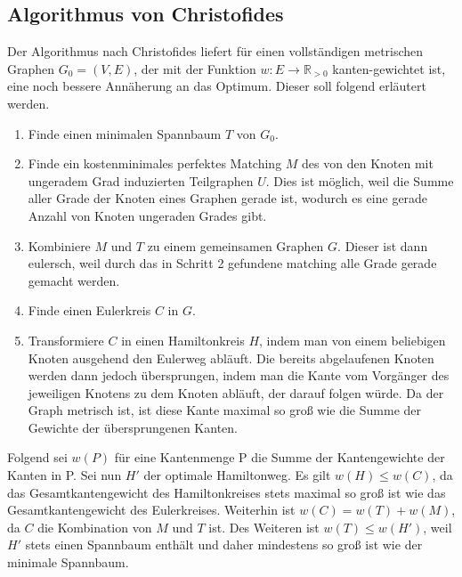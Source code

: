 \subsection{Algorithmus von Christofides}
Der Algorithmus nach Christofides liefert für einen vollständigen metrischen Graphen $G_0=(V,E)$, der mit der Funktion $w:E\rightarrow  \mathbb{R}_{>0}$ kanten-gewichtet ist, eine noch bessere Annäherung an das Optimum. Dieser soll folgend erläutert werden.

\begin{enumerate}
\item Finde einen minimalen Spannbaum $T$ von $G_0$.
\item Finde ein kostenminimales perfektes Matching $M$ des von den Knoten mit ungeradem Grad induzierten Teilgraphen $U$. Dies ist möglich, weil die Summe aller Grade der Knoten eines Graphen gerade ist, wodurch es eine gerade Anzahl von Knoten ungeraden Grades gibt.
\item Kombiniere $M$ und $T$ zu einem gemeinsamen Graphen $G$. Dieser ist dann eulersch, weil durch das in Schritt 2 gefundene matching alle Grade gerade gemacht werden.
\item Finde einen Eulerkreis $C$ in $G$.
\item Transformiere $C$ in einen Hamiltonkreis $H$, indem man von einem beliebigen Knoten ausgehend den Eulerweg abläuft. Die bereits abgelaufenen Knoten werden dann jedoch übersprungen, indem man die Kante vom Vorgänger des jeweiligen Knotens zu dem Knoten abläuft, der darauf folgen würde. Da der Graph metrisch ist, ist diese Kante maximal so groß wie die Summe der Gewichte der übersprungenen Kanten.
\end{enumerate}

Folgend sei $w(P)$ für eine Kantenmenge P die Summe der Kantengewichte der Kanten in P. Sei nun $H'$ der optimale Hamiltonweg. Es gilt $w(H)\leq w(C)$, da das Gesamtkantengewicht des Hamiltonkreises stets maximal so groß ist wie das Gesamtkantengewicht des Eulerkreises. Weiterhin ist $w(C)=w(T)+w(M)$, da $C$ die Kombination von $M$ und $T$ ist. Des Weiteren ist $w(T)\leq w(H')$, weil $H'$ stets einen Spannbaum enthält und daher mindestens so groß ist wie der minimale Spannbaum.

